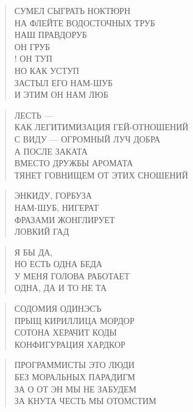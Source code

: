 \poemtitle{***}
\begin{verse}
СУМЕЛ СЫГРАТЬ НОКТЮРН\\
НА ФЛЕЙТЕ ВОДОСТОЧНЫХ ТРУБ\\
НАШ ПРАВДОРУБ\\
ОН ГРУБ\\!
ОН ТУП\\
НО КАК УСТУП\\
ЗАСТЫЛ ЕГО НАМ-ШУБ\\
И ЭТИМ ОН НАМ ЛЮБ
\end{verse}

\poemtitle{***}
\begin{verse}
ЛЕСТЬ — \\
КАК ЛЕГИТИМИЗАЦИЯ ГЕЙ-ОТНОШЕНИЙ\\
С ВИДУ — ОГРОМНЫЙ ЛУЧ ДОБРА\\
А ПОСЛЕ ЗАКАТА \\
ВМЕСТО ДРУЖБЫ АРОМАТА\\
ТЯНЕТ ГОВНИЩЕМ ОТ ЭТИХ СНОШЕНИЙ
\end{verse}

\poemtitle{***}
\begin{verse}
ЭНКИДУ, ГОРБУЗА\\
НАМ-ШУБ, НИГЕРАТ\\
ФРАЗАМИ ЖОНГЛИРУЕТ\\
ЛОВКИЙ ГАД
\end{verse}

\poemtitle{***}
\begin{verse}
Я БЫ ДА,\\
НО ЕСТЬ ОДНА БЕДА\\
У МЕНЯ ГОЛОВА РАБОТАЕТ\\
ОДНА, ДА И ТО НЕ ТА
\end{verse}

\poemtitle{***}
\begin{verse}
СОДОМИЯ ОДИНЭСЪ\\
ПРЫЩ КИРИЛЛИЦА МОРДОР\\
СОТОНА ХЕРАЧИТ КОДЫ\\
КОНФИГУРАЦИЯ ХАРДКОР
\end{verse}

\poemtitle{***}
\begin{verse}
ПРОГРАММИСТЫ ЭТО ЛЮДИ\\
БЕЗ МОРАЛЬНЫХ ПАРАДИГМ\\
ЗА О ОТ ЭН МЫ  НЕ ЗАБУДЕМ\\
ЗА КНУТА ЧЕСТЬ МЫ ОТОМСТИМ
\end{verse}

